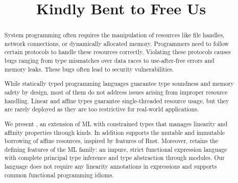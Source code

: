 \documentclass[acmsmall,review,anonymous,table]{acmart}
\begin{document}
\title{Kindly Bent to Free Us}
\begin{abstract}
  System programming often requires the manipulation of resources like
  file handles, network connections, or dynamically allocated
  memory. Programmers need to follow certain protocols to handle
  these resources correctly. Violating these protocols causes bugs
  ranging from type mismatches over data races to use-after-free 
  errors and memory leaks. These bugs often lead to security  vulnerabilities.

  While statically typed programming languages guarantee type soundness and memory 
  safety by design, most of them do not address issues arising
  from improper resource handling. 
  Linear and affine types guarantee single-threaded resource usage,
  but they are rarely deployed as they are too restrictive for real-world applications.

  We present \lang, an extension of ML with constrained types that
  manages linearity and affinity properties through kinds. In addition
  \lang{} supports the mutable and immutable borrowing of affine
  resources, inspired by features of Rust.
  Moreover, \lang{} retains the defining features of the ML family:
  an impure, strict functional expression language with complete principal type
  inference and type abstraction through modules.
  Our language does not require any linearity annotations in
  expressions and supports common functional programming idioms.
\end{abstract}


\maketitle







\clearpage






\appendix





\end{document}
